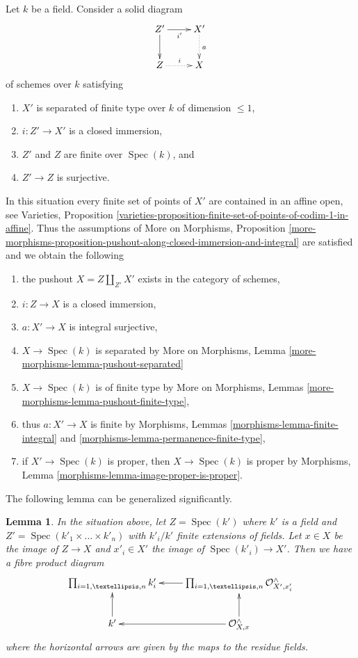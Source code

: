 \documentclass{stacks-project}
\theoremstyle{plain}
\newtheorem{lemma}[subsection]{Lemma}
\theoremstyle{definition}
\theoremstyle{remark}
\numberwithin{equation}{subsection}
\def\Spec{\mathop{\mathrm{Spec}}}
\begin{document}
\noindent
Let $k$ be a field. Consider a solid diagram
$$
\xymatrix{
Z' \ar[d] \ar[r]_{i'} & X' \ar@{..>}[d]^a \\
Z \ar@{..>}[r]^i & X
}
$$
of schemes over $k$ satisfying
\begin{enumerate}
\item[(a)] $X'$ is separated of finite type over $k$ of dimension $\leq 1$,
\item[(b)] $i : Z' \to X'$ is a closed immersion,
\item[(c)] $Z'$ and $Z$ are finite over $\Spec(k)$, and
\item[(d)] $Z' \to Z$ is surjective.
\end{enumerate}
In this situation every finite set of points of $X'$ are contained
in an affine open, see Varieties, Proposition
\ref{varieties-proposition-finite-set-of-points-of-codim-1-in-affine}.
Thus the assumptions of
More on Morphisms, Proposition
\ref{more-morphisms-proposition-pushout-along-closed-immersion-and-integral}
are satisfied and we obtain the following
\begin{enumerate}
\item the pushout $X = Z \amalg_{Z'} X'$ exists in the category of schemes,
\item $i : Z \to X$ is a closed immersion,
\item $a : X' \to X$ is integral surjective,
\item $X \to \Spec(k)$ is separated by More on Morphisms, Lemma
\ref{more-morphisms-lemma-pushout-separated}
\item $X \to \Spec(k)$ is of finite type by
More on Morphisms, Lemmas \ref{more-morphisms-lemma-pushout-finite-type},
\item thus $a : X' \to X$ is finite by
Morphisms, Lemmas \ref{morphisms-lemma-finite-integral} and
\ref{morphisms-lemma-permanence-finite-type},
\item if $X' \to \Spec(k)$ is proper, then $X \to \Spec(k)$ is proper
by Morphisms, Lemma \ref{morphisms-lemma-image-proper-is-proper}.
\end{enumerate}

\noindent
The following lemma can be generalized significantly.

\begin{lemma}
\label{lemma-complete-local-ring-pushout}
In the situation above, let $Z = \Spec(k')$ where $k'$ is a field and
$Z' = \Spec(k'_1 \times \ldots \times k'_n)$ with $k'_i/k'$
finite extensions of fields. Let $x \in X$ be the image of $Z \to X$
and $x'_i \in X'$ the image of $\Spec(k'_i) \to X'$.
Then we have a fibre product diagram
$$
\xymatrix{
\prod\nolimits_{i = 1, \ldots, n} k'_i &
\prod\nolimits_{i = 1, \ldots, n} \mathcal{O}_{X', x'_i}^\wedge \ar[l] \\
k' \ar[u] &
\mathcal{O}_{X, x}^\wedge \ar[u] \ar[l]
}
$$
where the horizontal arrows are given by the maps to the residue fields.
\end{lemma}
\end{document}
